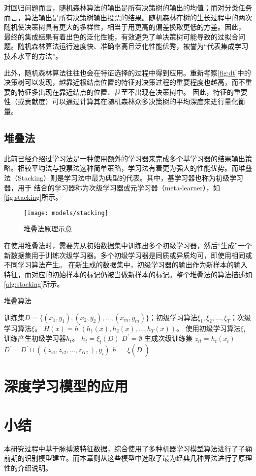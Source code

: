 对回归问题而言，随机森林算法的输出是所有决策树的输出的均值；而对分类任务而言，算法输出是所有决策树输出投票的结果。随机森林在树的生长过程中的两次随机使决策树具有更大的多样性，相当于用更高的偏差换取更低的方差。因此，
最终的集成结果有着出色的泛化性能，有效避免了单决策树可能导致的过拟合问题。随机森林算法运行速度快、准确率高且泛化性能优秀，被誉为“代表集成学习技术水平的方法”\cite{Zhou2016,Liu2018}。

此外，随机森林算法往往也会在特征选择的过程中得到应用\cite{Aurélien2018}。重新考察\autoref{fig:dt}中的决策树可以发现，越靠近根结点位置的特征对决策过程的重要程度也越高，而不重要的特征多出现在靠近结点的位置、甚至不出现在决策树中。
因此，特征的重要性（或贡献度）可以通过计算其在随机森林众多决策树的平均深度来进行量化衡量。

\subsection{堆叠法}
此前已经介绍过学习法是一种使用额外的学习器来完成多个基学习器的结果输出策略。相较平均法与投票法这种简单策略，学习法有着更为强大的性能优势。而堆叠法（Stacking）则是学习法中最为典型的代表。其中，基学习器也称为初级学习器，用于
结合的学习器称为次级学习器或元学习器（meta-learner），如\autoref{fig:stacking}所示。

\begin{figure}[htbp]
    \centering
    \texttt{[image: models/stacking]}
    \caption{\label{fig:stacking}堆叠法原理示意}
\end{figure}

在使用堆叠法时，需要先从初始数据集中训练出多个初级学习器，然后“生成”一个新数据集用于训练次级学习器。多个初级学习器是同质或异质均可，即使用相同或不同学习算法产生。
在新生成的数据集中，初级学习器的输出作为新样本的输入特征，而对应的初始样本的标记仍被当做新样本的标记。整个堆叠法的算法描述如\autoref{alg:stacking}所示。
\begin{breakablealgorithm}
    \caption[堆叠算法]{堆叠算法\cite{Zhou2016}}
    \label{alg:stacking}
    \begin{algorithmic}[1] %
        \Require 训练集$D=\{(x_1,y_1),(x_2,y_2),\dots,(x_m,y_m)\}$；初级学习算法$\xi_1,\xi_2,\dots,\xi_T$；次级学习算法$\xi$。
        \Ensure $H(x)=h^{'}(h_1(x),h_2(x),\dots,h_T(x))$。
            \State 使用初级学习算法$\xi_t$训练产生初级学习器$h_t$。
            \State $h_t=\xi_t (D)$
        \EndFor
        \State $D^{'}=\emptyset$
        \State 生成次级训练集
                \State $z_{it}=h_t(x_i)$
            \EndFor
            \State $D^{'}=D^{'} \cup ((z_{i1},z_{i2},\dots,z_{iT},),y_i)$
        \EndFor
        \State $h^{'}=\xi(D^{'})$
    \end{algorithmic}
\end{breakablealgorithm}


\section{深度学习模型的应用}
\section{小结}
本研究过程中基于脉搏波特征数据，综合使用了多种机器学习模型算法进行了子痫前期的识别模型建立。而本章则从这些模型中选取了最为经典几种算法进行了原理性的介绍说明。
